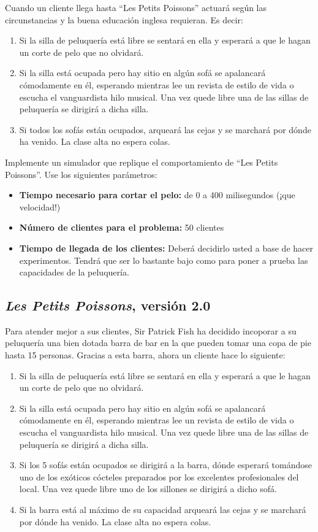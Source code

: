 \documentclass[a4paper]{article}
\begin{document}
Cuando un cliente llega hasta ``Les Petits Poissons'' actuará según las circunstancias y la buena educación inglesa requieran. Es decir:

\begin{enumerate}
    \item Si la silla de peluquería está libre se sentará en ella y esperará a que le hagan un corte de pelo que no olvidará.
    \item Si la silla está ocupada pero hay sitio en algún sofá se apalancará cómodamente en él, esperando mientras lee un revista de estilo de vida o escucha el vanguardista hilo musical. Una vez quede libre una de las sillas de peluquería se dirigirá a dicha silla.
    \item Si todos los sofás están ocupados, arqueará las cejas y se marchará por dónde ha venido. La clase alta no espera colas.
\end{enumerate}

Implemente un simulador que replique el comportamiento de ``Les Petits Poissons''. Use los siguientes parámetros:

\begin{itemize}
    \item \textbf{Tiempo necesario para cortar el pelo:} de 0 a 400 milisegundos (¡que velocidad!)
    \item \textbf{Número de clientes para el problema:} 50 clientes
    \item \textbf{Tiempo de llegada de los clientes:} Deberá decidirlo usted a base de hacer experimentos. Tendrá que ser lo bastante bajo como para poner a prueba las capacidades de la peluquería.
\end{itemize}

\subsection{\textit{Les Petits Poissons}, versión 2.0}

Para atender mejor a sus clientes, Sir Patrick Fish ha decidido incoporar a su peluquería una bien dotada barra de bar en la que pueden tomar una copa de pie hasta 15 personas. Gracias a esta barra, ahora un cliente hace lo siguiente:

\begin{enumerate}
    \item Si la silla de peluquería está libre se sentará en ella y esperará a que le hagan un corte de pelo que no olvidará.
    \item Si la silla está ocupada pero hay sitio en algún sofá se apalancará cómodamente en él, esperando mientras lee un revista de estilo de vida o escucha el vanguardista hilo musical. Una vez quede libre una de las sillas de peluquería se dirigirá a dicha silla.
    \item Si los 5 sofás están ocupados se dirigirá a la barra, dónde esperará tomándose uno de los exóticos cócteles preparados por los excelentes profesionales del local. Una vez quede libre uno de los sillones se dirigirá a dicho sofá.
    \item Si la barra está al máximo de su capacidad arqueará las cejas y se marchará por dónde ha venido. La clase alta no espera colas.
\end{enumerate}
\end{document}
